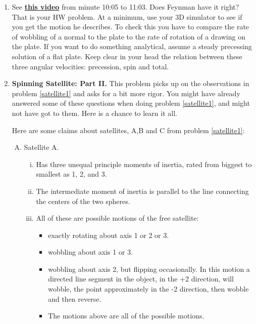 \documentclass[11pt]{article}
\def\bluehref#1#2{\href{#1}{\color{blue}\bf #2}}
\begin{document}
\begin{enumerate}
\item
\label{Feynmanplate}
See \bluehref{http://www.youtube.com/watch?v=dQai9QikTBI}{this video} from minute 10:05 to 11:03.
 Does Feynman have it right? That is your HW problem.  At a minimum, use your 3D simulator to see if you get the motion he describes.  To check this you have to compare the rate of wobbling of a normal to the plate to the rate of rotation of a drawing on the plate.   If you want to do something analytical,   assume a steady precessing solution of a flat plate.
Keep clear in your head the relation between these three angular velocities: precession, spin and total.  




\item \textbf{Spinning Satellite: Part II.}   \label{satelite2} This problem picks up on the observations in problem \ref{satellite1} and asks for a bit more rigor. You might have already answered some of these questions when doing problem \ref{satellite1}, and might not have got to them. Here is a chance to learn it all.


Here are some claims about satellites, A,B and C from problem \ref{satellite1}:

\begin{enumerate}[A)]

\item Satellite A.
\begin{enumerate}[i.]
 \item Has three unequal principle moments of inertia, rated from biggest to smallest as 1, 2, and 3.  
 \item The intermediate moment of inertia is parallel to the line connecting the centers of the two spheres.
 \item All of these are possible motions of the free satellite:

 \begin{itemize}
 \item exactly rotating  about axis 1 or 2 or 3.
 \item  wobbling about axis 1 or 3.
 \item  wobbling about axis 2, but flipping occasionally.  In this motion  a directed line segment  in the object, in the +2 direction, will wobble, the point approximately in the -2 direction, then wobble and then reverse.
 \item  The motions above are all of the possible motions.
 \end{itemize} 
 

\end{enumerate}
\end{enumerate}
\end{enumerate}
\end{document}
